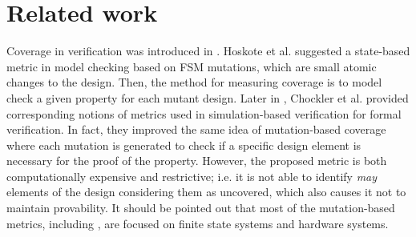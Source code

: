 \section{Related work}
\label{sec:related}




Coverage in verification was introduced in \cite{hoskote1999coverage, katz1999have}. Hoskote et al. \cite{hoskote1999coverage} suggested a state-based metric in model checking based on FSM mutations, which are small atomic changes to the design. Then, the method for measuring coverage is to model check a given property for each mutant design.
Later in \cite{chockler_coverage_2003}, Chockler et al. provided corresponding notions of metrics used in simulation-based verification for formal verification. In fact, they improved the same idea of mutation-based coverage where each mutation is generated to check if a specific
design element is necessary for the proof of the property.
 However, the proposed metric is both computationally expensive and restrictive; i.e. it is not able to identify \emph{may} elements of the design considering them as uncovered, which also causes it not to maintain provability. It should be pointed out that most of the mutation-based metrics, including \cite{kupferman_theory_2008, chockler2001practical}, are focused on finite state systems and hardware systems.

